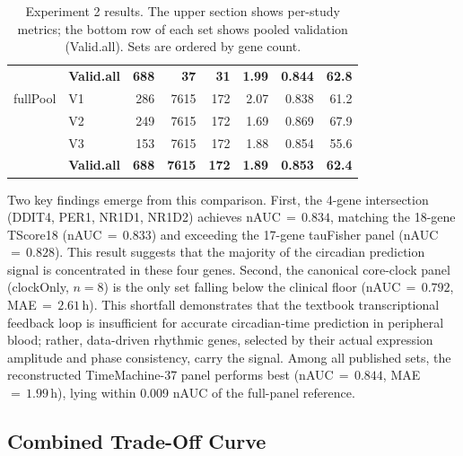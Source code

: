 \documentclass[10pt,a4paper]{article}
\begin{document}
\begin{table}[h]
\begin{tabular}{llrrrrrr}
              & \textbf{Valid.all} & \textbf{688} & \textbf{37}
                & \textbf{31} & \textbf{1.99} & \textbf{0.844}
                & \textbf{62.8} \\
\addlinespace
fullPool     & V1 & 286 & 7615 & 172 & 2.07 & 0.838 & 61.2 \\
             & V2 & 249 & 7615 & 172 & 1.69 & 0.869 & 67.9 \\
             & V3 & 153 & 7615 & 172 & 1.88 & 0.854 & 55.6 \\
             & \textbf{Valid.all} & \textbf{688} & \textbf{7615}
               & \textbf{172} & \textbf{1.89} & \textbf{0.853}
               & \textbf{62.4} \\
\bottomrule
\end{tabular}
\caption{Experiment 2 results.  The upper section shows per-study
metrics; the bottom row of each set shows pooled validation
(Valid.all).
Sets are ordered by gene count.}
\label{tab:exp2}
\end{table}

Two key findings emerge from this comparison.
First, the 4-gene intersection (DDIT4, PER1, NR1D1, NR1D2)
achieves nAUC\,${=}\,0.834$, matching the 18-gene TScore18
(nAUC\,${=}\,0.833$) and exceeding the 17-gene tauFisher panel
(nAUC\,${=}\,0.828$).
This result suggests that the majority of the circadian prediction
signal is concentrated in these four genes.
Second, the canonical core-clock panel (clockOnly, $n = 8$) is the
only set falling below the clinical floor (nAUC\,${=}\,0.792$,
MAE\,${=}\,2.61$\,h).
This shortfall demonstrates that the textbook transcriptional
feedback loop is insufficient for accurate circadian-time prediction
in peripheral blood;
rather, data-driven rhythmic genes, selected by
their actual expression amplitude and phase consistency, carry the
signal.
Among all published sets, the reconstructed TimeMachine-37 panel
performs best (nAUC\,${=}\,0.844$, MAE\,${=}\,1.99$\,h), lying within
0.009 nAUC of the full-panel reference.

\subsection{Combined Trade-Off Curve}
\end{document}
